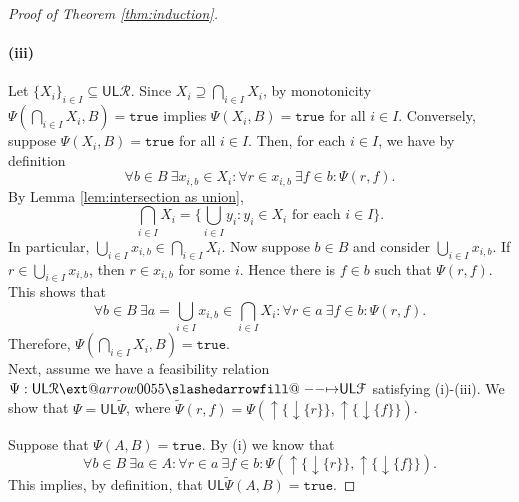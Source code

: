 \documentclass[12pt]{article}
\makeatletter
\theoremstyle{definition}
\theoremstyle{plain}
\theoremstyle{plain}
\theoremstyle{plain}
\theoremstyle{plain}
\theoremstyle{remark}
\theoremstyle{remark}
\newcommand{\mc}[1]{\mathcal{#1}}
\newcommand{\sub}{\subseteq}
\newcommand{\low}{\mathsf{L}}
\newcommand{\upper}{\mathsf{U}}
\newcommand{\true}{\mathtt{true}}
\newcommand{\upc}[1]{{\uparrow #1}}
\newcommand{\lwc}[1]{{\downarrow #1}}
\def\slashedarrowfill@#1#2#3#4#5{%
	$\m@th\thickmuskip0mu\medmuskip\thickmuskip\thinmuskip\thickmuskip
	\relax#5#1\mkern-7mu%
	\cleaders\hbox{$#5\mkern-2mu#2\mkern-2mu$}\hfill
	\mathclap{#3}\mathclap{#2}%
	\cleaders\hbox{$#5\mkern-2mu#2\mkern-2mu$}\hfill
	\mkern-7mu#4$%
}
\def\rightslashedarrowfill@{%
	\slashedarrowfill@\relbar\relbar\mapstochar\rightarrow}
\newcommand\xslashedrightarrow[2][]{%
	\ext@arrow 0055{\rightslashedarrowfill@}{#1}{#2}}
\makeatother
\begin{document}
\begin{proof}[Proof of Theorem \ref{thm:induction}]
	\paragraph{(iii)} Let $\{X_i\}_{i \in I} \sub \upper\low\mc{R}$. Since $X_i \supseteq \bigcap_{i \in I} X_i$, by monotonicity $\Psi(\bigcap_{i \in I}X_i,B) = \true$ implies $\Psi(X_i,B) = \true$ for all $i \in I$. Conversely, suppose $\Psi(X_i,B) = \true$ for all $i \in I$. Then, for each $i \in I$, we have by definition
	$$\forall b \in B \: \exists x_{i,b} \in X_i : \forall r \in x_{i,b} \: \exists f \in b : \Psi(r,f).$$
	By Lemma \ref{lem:intersection as union}, 
	$$\bigcap_{i \in I} X_i = \{ \bigcup_{i \in I} y_i :  y_i \in X_i \text{ for each } i \in I \}.$$
	In particular,  $\bigcup_{i \in I} x_{i,b} \in \bigcap_{i \in I} X_i$. Now suppose $b \in B$ and consider $\bigcup_{i \in I} x_{i,b}$. If $r \in \bigcup_{i \in I} x_{i,b}$, then $r \in x_{i,b}$ for some $i$. Hence there is $f \in b$ such that $\Psi(r,f)$. This shows that
	$$\forall b \in B \: \exists a = \bigcup_{i \in I} x_{i,b} \in \bigcap_{i \in I} X_i : \forall r \in a \: \exists f \in b : \Psi(r,f).$$
	Therefore, $\Psi(\bigcap_{i \in I}X_i,B) = \true$. \\
	
	Next, assume we have a feasibility relation $\Psi: \upper\low\mc{R} \xslashedrightarrow{} \upper\low\mc{F}$ satisfying (i)-(iii). We show that $\Psi = \upper\low\tilde\Psi$, where $\tilde\Psi(r,f) = \Psi(\upc\{\lwc{\{r\}}\},\upc\{\lwc{\{f\}}\})$.
	
	Suppose that $\Psi(A,B) = \true$. By (i) we know that $$\forall b \in B \: \exists a \in A : \forall r \in a \: \exists f \in b: \Psi(\upc\{\lwc{\{r\}}\},\upc\{\lwc{\{f\}}\}).$$ This implies, by definition, that $\upper\low\tilde\Psi(A,B) = \true$.
	

\end{proof}
\end{document}
